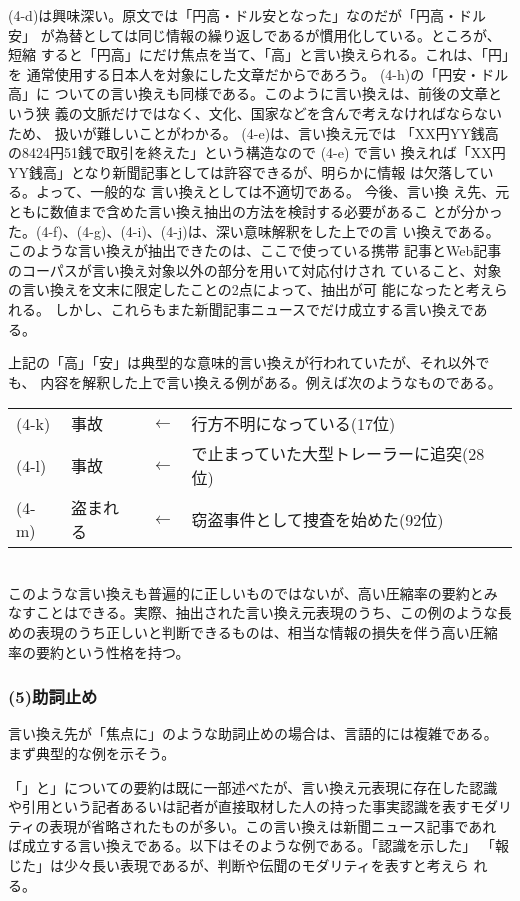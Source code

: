 \documentclass[jnlpbbl]{jnlp_j}
\begin{document}
(4-d)は興味深い。原文では「円高・ドル安となった」なのだが「円高・ドル安」
が為替としては同じ情報の繰り返しであるが慣用化している。ところが、短縮
すると「円高」にだけ焦点を当て、「高」と言い換えられる。これは、「円」を
通常使用する日本人を対象にした文章だからであろう。
(4-h)の「円安・ドル高」に
ついての言い換えも同様である。このように言い換えは、前後の文章という狭
義の文脈だけではなく、文化、国家などを含んで考えなければならないため、
扱いが難しいことがわかる。
(4-e)は、言い換え元では
「XX円YY銭高の8424円51銭で取引を終えた」という構造なので (4-e) で言い
換えれば「XX円YY銭高」となり新聞記事としては許容できるが、明らかに情報
は欠落している。よって、一般的な
言い換えとしては不適切である。
今後、言い換
え先、元ともに数値まで含めた言い換え抽出の方法を検討する必要があるこ
とが分かった。(4-f)、(4-g)、(4-i)、(4-j)は、深い意味解釈をした上での言
い換えである。このような言い換えが抽出できたのは、ここで使っている携帯
記事とWeb記事のコーパスが言い換え対象以外の部分を用いて対応付けされ
ていること、対象の言い換えを文末に限定したことの2点によって、抽出が可
能になったと考えられる。
しかし、これらもまた新聞記事ニュースでだけ成立する言い換えである。

上記の「高」「安」は典型的な意味的言い換えが行われていたが、それ以外でも、
内容を解釈した上で言い換える例がある。例えば次のようなものである。
\\

\begin{tabular}{llcl}
(4-k) & 事故　 & $\leftarrow$ &  行方不明になっている(17位) \\
(4-l) & 事故　 & $\leftarrow$ &  で止まっていた大型トレーラーに追突(28位) \\
(4-m) & 盗まれる  & $\leftarrow$ &  窃盗事件として捜査を始めた(92位) 
\end{tabular}
\\

このような言い換えも普遍的に正しいものではないが、高い圧縮率の要約とみ
なすことはできる。実際、抽出された言い換え元表現のうち、この例のような長
めの表現のうち正しいと判断できるものは、相当な情報の損失を伴う高い圧縮
率の要約という性格を持つ。

\subsubsection*{(5)助詞止め}

言い換え先が「焦点に」のような助詞止めの場合は、言語的には複雑である。
まず典型的な例を示そう。　

「」と」についての要約は既に一部述べたが、言い換え元表現に存在した認識
や引用という記者あるいは記者が直接取材した人の持った事実認識を表すモダリ
ティの表現が省略されたものが多い。この言い換えは新聞ニュース記事であれ
ば成立する言い換えである。以下はそのような例である。「認識を示した」
「報じた」は少々長い表現であるが、判断や伝聞のモダリティを表すと考えら
れる。
\\
\end{document}
